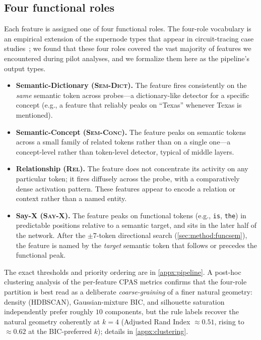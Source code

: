 \subsection{Four functional roles}
\label{sec:method:rules}
Each feature is assigned one of four functional roles. The four-role vocabulary is an empirical extension of the supernode types that appear in circuit-tracing case studies~\cite{lindsey2025biology,ameisen2025circuittracing}; we found that these four roles covered the vast majority of features we encountered during pilot analyses, and we formalize them here as the pipeline's output types.

\begin{itemize}\itemsep0pt
\item \textbf{Semantic-Dictionary (\textsc{Sem-Dict}).} The feature fires consistently on the \emph{same} semantic token across probes---a dictionary-like detector for a specific concept (e.g., a feature that reliably peaks on ``Texas'' whenever Texas is mentioned).
\item \textbf{Semantic-Concept (\textsc{Sem-Conc}).} The feature peaks on semantic tokens across a small family of related tokens rather than on a single one---a concept-level rather than token-level detector, typical of middle layers.
\item \textbf{Relationship (\textsc{Rel}).} The feature does not concentrate its activity on any particular token; it fires diffusely across the probe, with a comparatively dense activation pattern. These features appear to encode a relation or context rather than a named entity.
\item \textbf{Say-X (\textsc{Say-X}).} The feature peaks on functional tokens (e.g., \texttt{is}, \texttt{the}) in predictable positions relative to a semantic target, and sits in the later half of the network. After the $\pm 7$-token directional search (\cref{sec:method:funcsem}), the feature is named by the \emph{target} semantic token that follows or precedes the functional peak.
\end{itemize}

The exact thresholds and priority ordering are in \cref{appx:pipeline}. A post-hoc clustering analysis of the per-feature CPAS metrics confirms that the four-role partition is best read as a deliberate \emph{coarse-graining} of a finer natural geometry: density (HDBSCAN), Gaussian-mixture BIC, and silhouette saturation independently prefer roughly $10$ components, but the rule labels recover the natural geometry coherently at $k{=}4$ (Adjusted Rand Index $\approx 0.51$, rising to $\approx 0.62$ at the BIC-preferred $k$); details in \cref{appx:clustering}.

